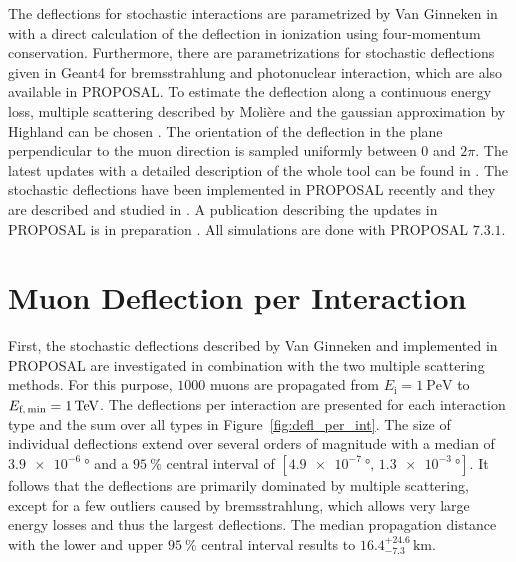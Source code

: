 \documentclass[pdflatex, sn-mathphys]{sn-jnl}%
\theoremstyle{thmstyleone}%
\theoremstyle{thmstyletwo}%
\theoremstyle{thmstylethree}%
\begin{document}
The deflections for stochastic interactions are parametrized by Van Ginneken 
in \cite{Van_Ginneken} with a direct calculation of the deflection in 
ionization using four-momentum conservation. 
Furthermore, there are parametrizations for stochastic deflections given in Geant4 \cite{GEANT4} 
for bremsstrahlung and photonuclear interaction, which 
are also available in PROPOSAL.
To estimate the deflection along 
a continuous energy loss, multiple scattering described by Molière 
\cite{moliere_scattering} and the gaussian approximation by Highland 
can be chosen \cite{HIGHLAND_1975}. 
The orientation of the deflection in the plane perpendicular to the muon direction is 
sampled uniformly between $0$ and $2\pi$.
The latest updates with a detailed description of the whole tool can be found 
in \cite{phd_soedingrekso}. 
The stochastic deflections have been implemented in PROPOSAL recently and they are 
described and studied in \cite{Gutjahr_2021}.
A publication describing the 
updates in PROPOSAL is in preparation \cite{Alameddine_2022}.
All simulations are done with PROPOSAL $7.3.1$.

\section{Muon Deflection per Interaction}\label{sec:defl_per_int}
First, the stochastic deflections described by Van Ginneken \cite{Van_Ginneken} 
and implemented 
in PROPOSAL are investigated in combination with the two multiple scattering methods. 
For this purpose, $\num{1000}$ muons are propagated from $E_{\text{i}} = \SI{1}{\peta\electronvolt}$ to $E_{\text{f,\,min}} = \SI{1}{\tera\electronvolt}$.
The deflections per interaction are presented 
for each interaction type and the sum over all types in Figure~\ref{fig:defl_per_int}. 
The size of individual deflections 
extend over several orders of magnitude with a median of $\SI{3.9e-6}{\degree}$
and a $\SI{95}{\percent}$ central interval of $[\SI{4.9e-7}{\degree}, \,\SI{1.3e-3}{\degree}]$. 
It follows that the deflections are primarily dominated by multiple scattering, except for a few outliers caused by bremsstrahlung, which 
allows very large energy losses and thus the largest deflections.
The median propagation distance with the lower and upper $\SI{95}{\percent}$ 
central interval results to $16.4_{-7.3}^{+24.6}\,\si{\kilo\meter}$.
\end{document}
